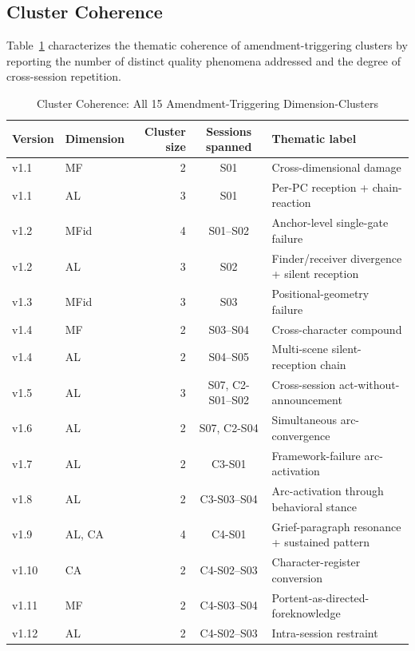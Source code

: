 \subsection{Cluster Coherence}

Table~\ref{tab:cluster-coherence} characterizes the thematic coherence of amendment-triggering
clusters by reporting the number of distinct quality phenomena addressed and the degree
of cross-session repetition.

\begin{table}[t]
\caption{Cluster Coherence: All 15 Amendment-Triggering Dimension-Clusters}
\label{tab:cluster-coherence}
\begin{tabular}{@{}llrcl@{}}
\toprule
Version & Dimension & Cluster size & Sessions spanned & Thematic label \\
\midrule
v1.1 & MF & 2 & S01 & Cross-dimensional damage \\
v1.1 & AL & 3 & S01 & Per-PC reception + chain-reaction \\
v1.2 & MFid & 4 & S01--S02 & Anchor-level single-gate failure \\
v1.2 & AL & 3 & S02 & Finder/receiver divergence + silent reception \\
v1.3 & MFid & 3 & S03 & Positional-geometry failure \\
v1.4 & MF & 2 & S03--S04 & Cross-character compound \\
v1.4 & AL & 2 & S04--S05 & Multi-scene silent-reception chain \\
v1.5 & AL & 3 & S07, C2-S01--S02 & Cross-session act-without-announcement \\
v1.6 & AL & 2 & S07, C2-S04 & Simultaneous arc-convergence \\
v1.7 & AL & 2 & C3-S01 & Framework-failure arc-activation \\
v1.8 & AL & 2 & C3-S03--S04 & Arc-activation through behavioral stance \\
v1.9 & AL, CA & 4 & C4-S01 & Grief-paragraph resonance + sustained pattern \\
v1.10 & CA & 2 & C4-S02--S03 & Character-register conversion \\
v1.11 & MF & 2 & C4-S03--S04 & Portent-as-directed-foreknowledge \\
v1.12 & AL & 2 & C4-S02--S03 & Intra-session restraint \\
\bottomrule
\end{tabular}
\end{table}

